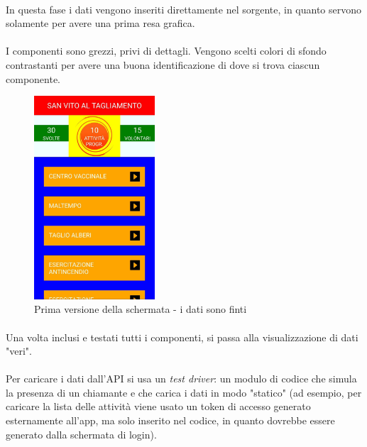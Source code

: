 \documentclass[11pt,a4paper,english]{article}
\begin{document}
\paragraph{} In questa fase i dati vengono inseriti direttamente nel sorgente, in quanto servono solamente per avere una prima resa grafica. 

\paragraph{} I componenti sono grezzi, privi di dettagli. Vengono scelti colori di sfondo contrastanti per avere una buona identificazione di dove si trova ciascun componente. 

\begin{figure}[H]
    \centering
    \includegraphics[width=0.4\textwidth]{img/app_1.jpeg}
    \caption{Prima versione della schermata - i dati sono finti}
\end{figure}

\paragraph{} Una volta inclusi e testati tutti i componenti, si passa alla visualizzazione di dati "veri". 

\paragraph{} Per caricare i dati dall'API si usa un \emph{test driver}: un modulo di codice che simula la presenza di un chiamante e che carica i dati in modo "statico" (ad esempio, per caricare la lista delle attività viene usato un token di accesso generato esternamente all'app, ma solo inserito nel codice, in quanto dovrebbe essere generato dalla schermata di login). 
\end{document}
